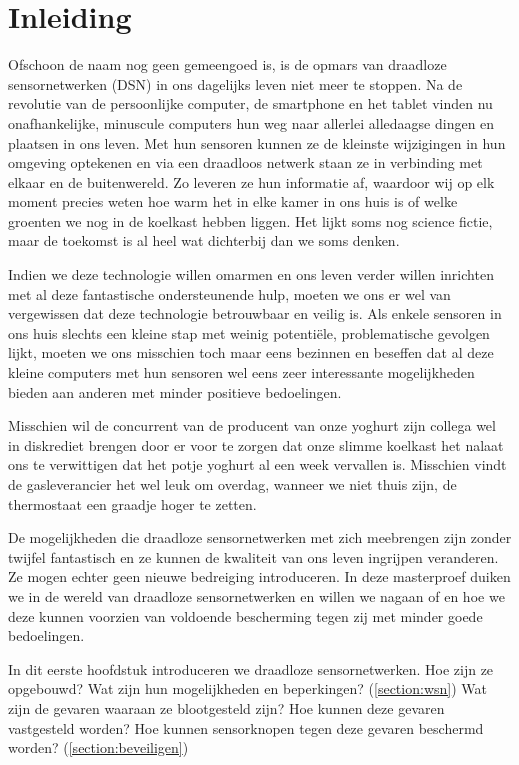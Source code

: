
\chapter{Inleiding}
\label{inleiding}

Ofschoon de naam nog geen gemeengoed is, is de opmars van draadloze
sensornetwerken (DSN) in ons dagelijks leven niet meer te stoppen. Na de
revolutie van de persoonlijke computer, de smartphone en het tablet vinden nu
onafhankelijke, minuscule computers hun weg naar allerlei alledaagse dingen en
plaatsen in ons leven. Met hun sensoren kunnen ze de kleinste wijzigingen in
hun omgeving optekenen en via een draadloos netwerk staan ze in verbinding met
elkaar en de buitenwereld. Zo leveren ze hun informatie af, waardoor wij op elk
moment precies weten hoe warm het in elke kamer in ons huis is of welke
groenten we nog in de koelkast hebben liggen. Het lijkt soms nog science
fictie, maar de toekomst is al heel wat dichterbij dan we soms denken.

Indien we deze technologie willen omarmen en ons leven verder willen inrichten
met al deze fantastische ondersteunende hulp, moeten we ons er wel van
vergewissen dat deze technologie betrouwbaar en veilig is. Als enkele sensoren
in ons huis slechts een kleine stap met weinig potenti\"ele, problematische
gevolgen lijkt, moeten we ons misschien toch maar eens bezinnen en beseffen dat
al deze kleine computers met hun sensoren wel eens zeer interessante
mogelijkheden bieden aan anderen met minder positieve bedoelingen.

Misschien wil de concurrent van de producent van onze yoghurt zijn collega wel
in diskrediet brengen door er voor te zorgen dat onze slimme koelkast het
nalaat ons te verwittigen dat het potje yoghurt al een week vervallen is.
Misschien vindt de gasleverancier het wel leuk om overdag, wanneer we niet
thuis zijn, de thermostaat een graadje hoger te zetten. 

De mogelijkheden die draadloze sensornetwerken met zich meebrengen zijn zonder
twijfel fantastisch en ze kunnen de kwaliteit van ons leven ingrijpen
veranderen. Ze mogen echter geen nieuwe bedreiging introduceren. In deze
masterproef duiken we in de wereld van draadloze sensornetwerken en willen we
nagaan of en hoe we deze kunnen voorzien van voldoende bescherming tegen zij
met minder goede bedoelingen.

In dit eerste hoofdstuk introduceren we draadloze sensornetwerken. Hoe zijn ze
opgebouwd? Wat zijn hun mogelijkheden en beperkingen? (\ref{section:wsn}) Wat
zijn de gevaren waaraan ze blootgesteld zijn? Hoe kunnen deze gevaren
vastgesteld worden? Hoe kunnen sensorknopen tegen deze gevaren beschermd
worden? (\ref{section:beveiligen})

